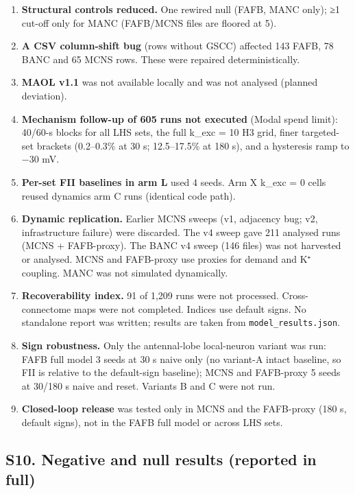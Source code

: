 \documentclass[11pt]{article}
\begin{document}
\begin{enumerate}
\item
  \textbf{Structural controls reduced.} One rewired null (FAFB, MANC only); ≥1 cut-off only for MANC (FAFB/MCNS files are floored at 5).
\item
  \textbf{A CSV column-shift bug} (rows without GSCC) affected 143 FAFB, 78 BANC and 65 MCNS rows. These were repaired deterministically.
\item
  \textbf{MAOL v1.1} was not available locally and was not analysed (planned deviation).
\item
  \textbf{Mechanism follow-up of 605 runs not executed} (Modal spend limit): 40/60-s blocks for all LHS sets, the full k\_exc = 10 H3 grid, finer targeted-set brackets (0.2--0.3\% at 30 s; 12.5--17.5\% at 180 s), and a hysteresis ramp to −30 mV.
\item
  \textbf{Per-set FII baselines in arm L} used 4 seeds. Arm X k\_exc = 0 cells reused dynamics arm C runs (identical code path).
\item
  \textbf{Dynamic replication.} Earlier MCNS sweeps (v1, adjacency bug; v2, infrastructure failure) were discarded. The v4 sweep gave 211 analysed runs (MCNS + FAFB-proxy). The BANC v4 sweep (146 files) was not harvested or analysed. MCNS and FAFB-proxy use proxies for demand and K⁺ coupling. MANC was not simulated dynamically.
\item
  \textbf{Recoverability index.} 91 of 1,209 runs were not processed. Cross-connectome maps were not completed. Indices use default signs. No standalone report was written; results are taken from \texttt{model\_results.json}.
\item
  \textbf{Sign robustness.} Only the antennal-lobe local-neuron variant was run: FAFB full model 3 seeds at 30 s naive only (no variant-A intact baseline, so FII is relative to the default-sign baseline); MCNS and FAFB-proxy 5 seeds at 30/180 s naive and reset. Variants B and C were not run.
\item
  \textbf{Closed-loop release} was tested only in MCNS and the FAFB-proxy (180 s, default signs), not in the FAFB full model or across LHS sets.
\end{enumerate}

\subsection{S10. Negative and null results (reported in full)}\label{s10.-negative-and-null-results-reported-in-full}
\end{document}
